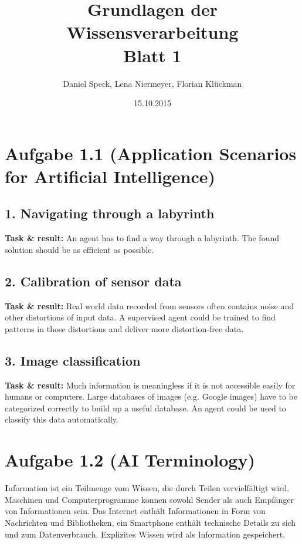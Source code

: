 \documentclass[10pt,a4paper]{article}
\title{\textbf{\huge Grundlagen der Wissensverarbeitung
\\\Large Blatt 1}}
\author{Daniel Speck, Lena Niermeyer, Florian Klückman}
\date{15.10.2015}
\begin{document}
	\maketitle




	\section*{Aufgabe 1.1 (Application Scenarios for Artificial Intelligence)}
	
		\subsection*{1. Navigating through a labyrinth}
		
			\textbf{Task \& result:} An agent has to find a way through a labyrinth. The found solution should be as efficient as possible.
		
		\subsection*{2. Calibration of sensor data}
		
			\textbf{Task \& result:} Real world data recorded from sensors often contains noise and other distortions of input data. A supervised agent could be trained to find patterns in those distortions and deliver more distortion-free data.
		
		\subsection*{3. Image classification}
		
			\textbf{Task \& result:} Much information is meaningless if it is not accessible easily for humans or computers. Large databases of images (e.g. Google images) have to be categorized correctly to build up a useful database. An agent could be used to classify this data automatically.
	
	\section*{Aufgabe 1.2 (AI Terminology)}

\textbf Information ist ein Teilmenge vom Wissen, die durch Teilen vervielfältigt wird. Maschinen und Computerprogramme können sowohl Sender als auch Empfänger von Informationen sein. Das Internet enthält Informationen in Form von Nachrichten und Bibliotheken, ein Smartphone enthält technische Details zu sich und zum Datenverbrauch. Explizites Wissen wird als Information gespeichert.
\end{document}
